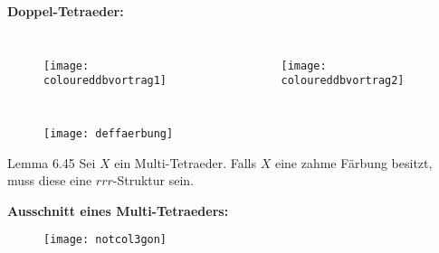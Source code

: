 \documentclass{beamer}
\begin{document}
\begin{frame}
\textbf{Doppel-Tetraeder:}
\begin{columns}

\begin{figure}[H]
\begin{center}
\texttt{[image: coloureddbvortrag1]}
\end{center}
\end{figure}  
\begin{figure}[H]
\begin{center}
\texttt{[image: coloureddbvortrag2]}
\end{center}
\end{figure}  
\end{columns}
\end{frame}

\begin{figure}[H]
\begin{center}
\texttt{[image: deffaerbung]}
\end{center}
\end{figure}
\begin{frame}
\begin{block}{Lemma 6.45}
Sei $X$ ein Multi-Tetraeder. Falls $X$ eine zahme Färbung besitzt, muss diese eine $rrr$-Struktur sein.
\end{block}
\end{frame}

\begin{frame}
\textbf{Ausschnitt eines Multi-Tetraeders:}
\begin{figure}[H]
\begin{center}
\texttt{[image: notcol3gon]}
\end{center}
\end{figure}
\end{frame}
\end{document}
